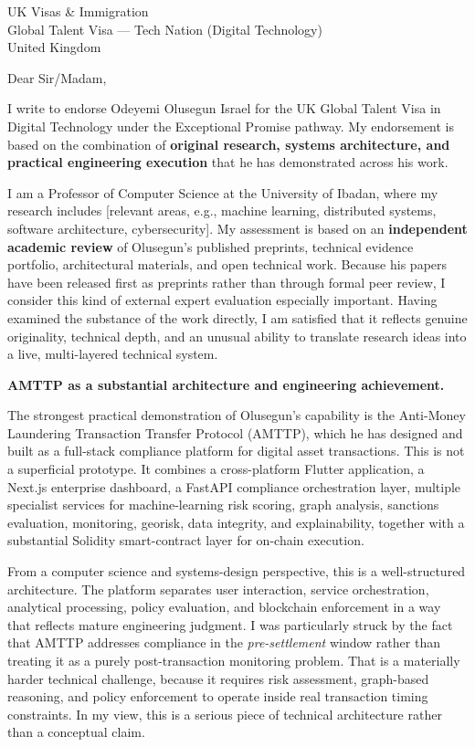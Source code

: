 \documentclass[12pt,a4paper]{letter}
\date{6 March 2026}
\begin{document}
\begin{letter}{UK Visas \& Immigration\\
Global Talent Visa --- Tech Nation (Digital Technology)\\
United Kingdom}

\opening{Dear Sir/Madam,}

I write to endorse Odeyemi Olusegun Israel for the UK Global Talent
Visa in Digital Technology under the Exceptional Promise pathway.
My endorsement is based on the combination of \textbf{original research,
systems architecture, and practical engineering execution} that he has
demonstrated across his work.

I am a Professor of Computer Science at the University of Ibadan, where my
research includes {[relevant areas, e.g., machine learning,
distributed systems, software architecture, cybersecurity]}.  My
assessment is based on an \textbf{independent academic review} of
Olusegun's published preprints, technical evidence portfolio,
architectural materials, and open technical work.  Because his papers
have been released first as preprints rather than through formal peer
review, I consider this kind of external expert evaluation especially
important.  Having examined the substance of the work directly, I am
satisfied that it reflects genuine originality, technical depth, and an
unusual ability to translate research ideas into a live, multi-layered
technical system.

\textbf{AMTTP as a substantial architecture and engineering achievement.}

The strongest practical demonstration of Olusegun's capability is the
Anti-Money Laundering Transaction Transfer Protocol (AMTTP), which he
has designed and built as a full-stack compliance platform for digital
asset transactions.  This is not a superficial prototype.  It combines a
cross-platform Flutter application, a Next.js enterprise dashboard, a
FastAPI compliance orchestration layer, multiple specialist services for
machine-learning risk scoring, graph analysis, sanctions evaluation,
monitoring, georisk, data integrity, and explainability, together with a
substantial Solidity smart-contract layer for on-chain execution.

From a computer science and systems-design perspective, this is a
well-structured architecture.  The platform separates user interaction,
service orchestration, analytical processing, policy evaluation, and
blockchain enforcement in a way that reflects mature engineering
judgment.  I was particularly struck by the fact that AMTTP addresses
compliance in the \textit{pre-settlement} window rather than treating it
as a purely post-transaction monitoring problem.  That is a materially
harder technical challenge, because it requires risk assessment,
graph-based reasoning, and policy enforcement to operate inside real
transaction timing constraints.  In my view, this is a serious piece of
technical architecture rather than a conceptual claim.


\end{letter}
\end{document}
